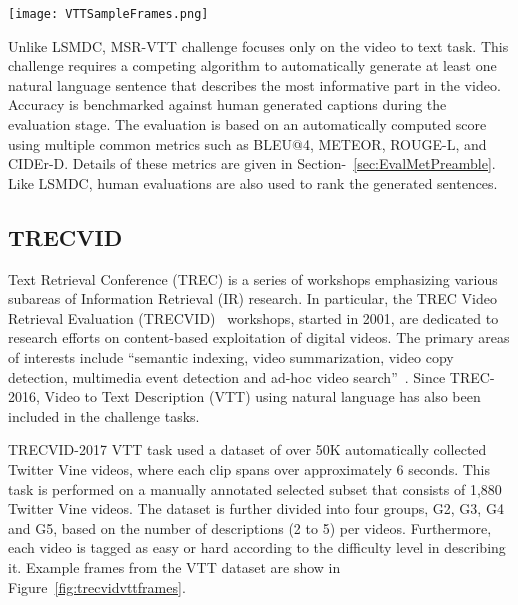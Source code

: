\documentclass[10pt,journal,compsoc]{IEEEtran}
\begin{document}
\begin{figure*}[htbp] %
   \centering
   \texttt{[image: VTTSampleFrames.png]} 
   \vspace{-4mm}
   \caption{Example video frames from TRECVID-VTT dataset. (a) Frames from the Easy-Video category and (b) frames from the Hard-Video category.}
   \label{fig:trecvidvttframes}
   \vspace{-6mm}
\end{figure*}

Unlike LSMDC, MSR-VTT challenge focuses only on the video to text task. This challenge requires a competing algorithm to automatically generate at least one natural language sentence that describes the most informative part in the video. Accuracy is benchmarked against human generated captions during the evaluation stage. The evaluation is based on an automatically computed score using multiple common metrics such as BLEU@4, METEOR, ROUGE-L, and CIDEr-D. Details of these metrics are given in Section-~\ref{sec:EvalMetPreamble}. Like LSMDC, human evaluations are also used to rank the generated sentences.
\vspace{-3mm}
\subsection{TRECVID}
Text Retrieval Conference (TREC) is a series of workshops emphasizing various subareas of Information Retrieval (IR) research. In particular, the TREC Video Retrieval Evaluation (TRECVID)~\cite{trecvidchallengehome} workshops, started in 2001, are dedicated to research efforts on content-based exploitation of digital videos. The primary areas of interests include ``semantic indexing, video summarization, video copy detection, multimedia event detection and ad-hoc video search''~\cite{trecvidchallengehome}. Since TREC-2016, Video to Text Description (VTT) \cite{awad2016trecvid} using natural language has also been included in the challenge tasks.

TRECVID-2017 VTT task used a dataset of over 50K automatically collected Twitter Vine videos, where each clip spans over approximately 6 seconds. This task is performed on a manually annotated selected subset that consists of 1,880 Twitter Vine videos. The dataset is further divided into four groups, G2, G3, G4 and G5, based on the number of descriptions (2 to 5) per videos. %
Furthermore, each video is tagged as easy or hard according to the difficulty level in describing it. Example frames from the VTT dataset are show in Figure~\ref{fig:trecvidvttframes}.
\end{document}
